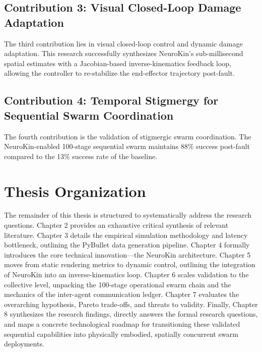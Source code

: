 \documentclass[12pt,a4paper,oneside]{report}
\begin{document}
\subsection{Contribution 3: Visual Closed-Loop Damage Adaptation}

The third contribution lies in visual closed-loop control and dynamic damage adaptation. This research successfully synthesizes NeuroKin's sub-millisecond spatial estimates with a Jacobian-based inverse-kinematics feedback loop, allowing the controller to re-stabilize the end-effector trajectory post-fault.

\subsection{Contribution 4: Temporal Stigmergy for Sequential Swarm Coordination}

The fourth contribution is the validation of stigmergic swarm coordination. The NeuroKin-enabled 100-stage sequential swarm maintains 88\% success post-fault compared to the 13\% success rate of the baseline.

\section{Thesis Organization}
\label{sec:thesis_organization_intro}

The remainder of this thesis is structured to systematically address the research questions. Chapter 2 provides an exhaustive critical synthesis of relevant literature. Chapter 3 details the empirical simulation methodology and latency bottleneck, outlining the PyBullet data generation pipeline. Chapter 4 formally introduces the core technical innovation---the NeuroKin architecture. Chapter 5 moves from static rendering metrics to dynamic control, outlining the integration of NeuroKin into an inverse-kinematics loop. Chapter 6 scales validation to the collective level, unpacking the 100-stage operational swarm chain and the mechanics of the inter-agent communication ledger. Chapter 7 evaluates the overarching hypothesis, Pareto trade-offs, and threats to validity. Finally, Chapter 8 synthesizes the research findings, directly answers the formal research questions, and maps a concrete technological roadmap for transitioning these validated sequential capabilities into physically embodied, spatially concurrent swarm deployments.

\clearpage

\end{document}
